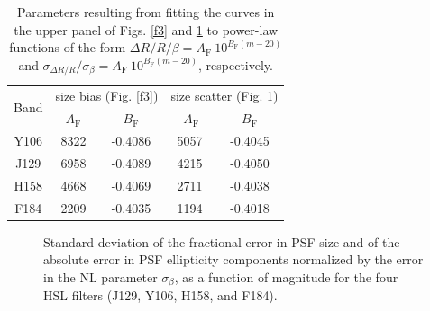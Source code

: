 \documentclass[11pt,preprint,flushrt]{aastex}
\begin{document}
\begin{table}
\centering
\begin{tabular}{|c|c|c|c|c|}
\hline
\multirow{2}{*}{Band} & \multicolumn{2}{c|}{size bias (Fig. \ref{f3})} & \multicolumn{2}{c|}{size scatter (Fig. \ref{f5})} \\
\cline{2-5}
& $A_{\text{F}}$ & $B_{\text{F}}$ & $\ A_{\text{F}}$ & $B_{\text{F}}$  \\
\hline
Y106 & 8322 & -0.4086 & 5057 &  -0.4045  \\
\hline
J129 & 6958 & -0.4089  & 4215 &  -0.4050 \\
\hline
H158 & 4668 & -0.4069 & 2711 &  -0.4038 \\
\hline
F184 & 2209 & -0.4035 & 1194 &  -0.4018 \\
\hline
\end{tabular}
\caption{Parameters resulting from fitting the curves in the upper panel of Figs. \ref{f3} and \ref{f5} to power-law functions of the form $\Delta R/ R/ \beta = A_{\text{F}}\ 10^{B_{\text{F}} (m - 20)}$ and $\sigma_{\Delta R/ R}/ \sigma_{\beta} = A_{\text{F}}\ 10^{B_{\text{F}} (m - 20)}$, respectively.}
\label{table2}
\end{table}

\begin{figure}[!h]
\centering
{}
\caption{Standard deviation of the fractional error in PSF size and of the absolute error in PSF ellipticity components normalized by the error in the NL parameter $\sigma_\beta$, as a function of magnitude for the four HSL filters (J129, Y106, H158, and F184).}
\label{f5}
\end{figure}
\end{document}
